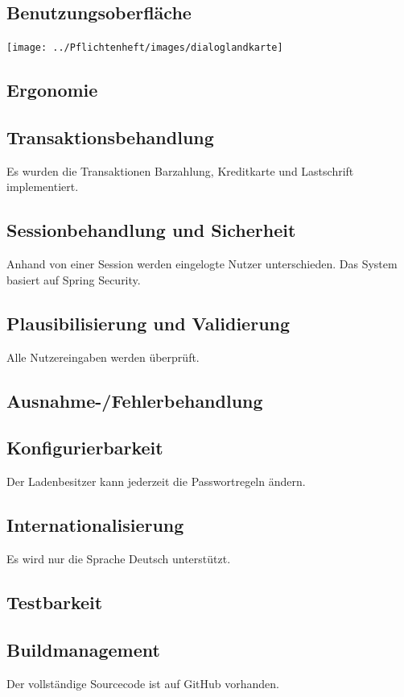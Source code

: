 \documentclass[pdftex,12pt,a4paper]{article}
\begin{document}
\subsection{Benutzungsoberfläche}
\texttt{[image: ../Pflichtenheft/images/dialoglandkarte]}

\subsection{Ergonomie}

\subsection{Transaktionsbehandlung}
Es wurden die Transaktionen Barzahlung, Kreditkarte und Lastschrift implementiert.

\subsection{Sessionbehandlung und Sicherheit}
Anhand von einer Session werden eingelogte Nutzer unterschieden. Das System basiert auf Spring Security.

\subsection{Plausibilisierung und Validierung}
Alle Nutzereingaben werden \"uberpr\"uft.
\subsection{Ausnahme-/Fehlerbehandlung}

\subsection{Konfigurierbarkeit}
Der Ladenbesitzer kann jederzeit die Passwortregeln \"andern.

\subsection{Internationalisierung}
Es wird nur die Sprache Deutsch unterst\"utzt.
\subsection{Testbarkeit}
\subsection{Buildmanagement}
Der vollst\"andige Sourcecode ist auf GitHub vorhanden.
\end{document}
